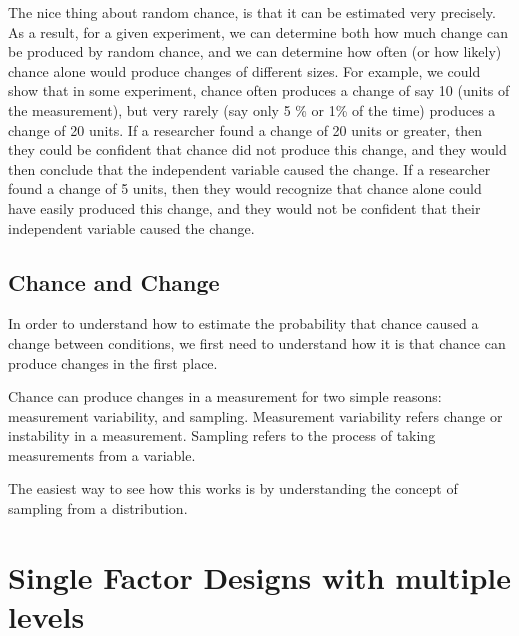 The nice thing about random chance, is that it can be estimated very precisely. As a result, for a given experiment, we can determine both how much change can be produced by random chance, and we can determine how often (or how likely) chance alone would produce changes of different sizes. For example, we could show that in some experiment, chance  often produces a change of say 10 (units of the measurement), but very rarely (say only 5 \% or 1\% of the time) produces a change of 20 units. If a researcher found a change of 20 units or greater, then they could be confident that chance did not produce this change, and they would then conclude that the independent variable caused the change. If a researcher found a change of 5 units, then they would recognize that chance alone could have easily produced this change, and they would not be confident that their independent variable caused the change.

\subsection{Chance and Change}

In order to understand how to estimate the probability that chance caused a change between conditions, we first need to understand how it is that chance can produce changes in the first place.

Chance can produce changes in a measurement for two simple reasons: measurement variability, and sampling. Measurement variability refers change or instability in a measurement. Sampling refers to the process of taking measurements from a variable.

The easiest way to see how this works is by understanding the concept of sampling from a distribution.



\section{Single Factor Designs with multiple levels}
